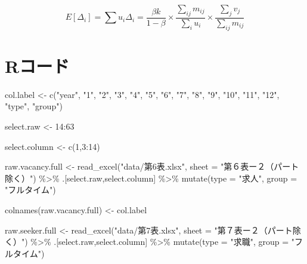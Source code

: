 \documentclass[
]{book}
\newenvironment{Shaded}{\begin{snugshade}}{\end{snugshade}}
\newcommand{\AttributeTok}[1]{\textcolor[rgb]{0.77,0.63,0.00}{#1}}
\newcommand{\DecValTok}[1]{\textcolor[rgb]{0.00,0.00,0.81}{#1}}
\newcommand{\FunctionTok}[1]{\textcolor[rgb]{0.00,0.00,0.00}{#1}}
\newcommand{\NormalTok}[1]{#1}
\newcommand{\OtherTok}[1]{\textcolor[rgb]{0.56,0.35,0.01}{#1}}
\newcommand{\SpecialCharTok}[1]{\textcolor[rgb]{0.00,0.00,0.00}{#1}}
\newcommand{\StringTok}[1]{\textcolor[rgb]{0.31,0.60,0.02}{#1}}
\begin{document}
\[E[\Delta_i]=\sum u_i\Delta_i=\frac{\beta k}{1-\beta}\times\frac{\sum_{ij}m_{ij}}{\sum_i u_i}\times \frac{\sum_{j}v_j}{\sum_{ij}m_{ij}}\]

\hypertarget{rux30b3ux30fcux30c9-1}{%
\section{Rコード}\label{rux30b3ux30fcux30c9-1}}

\begin{Shaded}
\begin{Highlighting}[]
\NormalTok{col.label }\OtherTok{\textless{}{-}} 
   \FunctionTok{c}\NormalTok{(}\StringTok{"year"}\NormalTok{,}
     \StringTok{"1"}\NormalTok{,}
     \StringTok{"2"}\NormalTok{,}
     \StringTok{"3"}\NormalTok{,}
     \StringTok{"4"}\NormalTok{,}
     \StringTok{"5"}\NormalTok{,}
     \StringTok{"6"}\NormalTok{,}
     \StringTok{"7"}\NormalTok{,}
     \StringTok{"8"}\NormalTok{,}
     \StringTok{"9"}\NormalTok{,}
     \StringTok{"10"}\NormalTok{,}
     \StringTok{"11"}\NormalTok{,}
     \StringTok{"12"}\NormalTok{,}
     \StringTok{"type"}\NormalTok{,}
     \StringTok{"group"}\NormalTok{)}

\NormalTok{select.raw }\OtherTok{\textless{}{-}} \DecValTok{14}\SpecialCharTok{:}\DecValTok{63}

\NormalTok{select.column }\OtherTok{\textless{}{-}} \FunctionTok{c}\NormalTok{(}\DecValTok{1}\NormalTok{,}\DecValTok{3}\SpecialCharTok{:}\DecValTok{14}\NormalTok{)}

\NormalTok{raw.vacancy.full }\OtherTok{\textless{}{-}}
  \FunctionTok{read\_excel}\NormalTok{(}\StringTok{"data/第6表.xlsx"}\NormalTok{,}
             \AttributeTok{sheet =} \StringTok{"第６表ー２（パート除く）"}\NormalTok{) }\SpecialCharTok{\%\textgreater{}\%}
\NormalTok{  .[select.raw,select.column] }\SpecialCharTok{\%\textgreater{}\%}
  \FunctionTok{mutate}\NormalTok{(}\AttributeTok{type =} \StringTok{"求人"}\NormalTok{,}
         \AttributeTok{group =} \StringTok{"フルタイム"}\NormalTok{)}

\FunctionTok{colnames}\NormalTok{(raw.vacancy.full) }\OtherTok{\textless{}{-}}\NormalTok{ col.label}

\NormalTok{raw.seeker.full }\OtherTok{\textless{}{-}}
  \FunctionTok{read\_excel}\NormalTok{(}\StringTok{"data/第7表.xlsx"}\NormalTok{,}
             \AttributeTok{sheet =} \StringTok{"第７表ー２（パート除く）"}\NormalTok{) }\SpecialCharTok{\%\textgreater{}\%}
\NormalTok{  .[select.raw,select.column] }\SpecialCharTok{\%\textgreater{}\%}
  \FunctionTok{mutate}\NormalTok{(}\AttributeTok{type =} \StringTok{"求職"}\NormalTok{,}
         \AttributeTok{group =} \StringTok{"フルタイム"}\NormalTok{)}


\end{Highlighting}
\end{Shaded}
\end{document}
